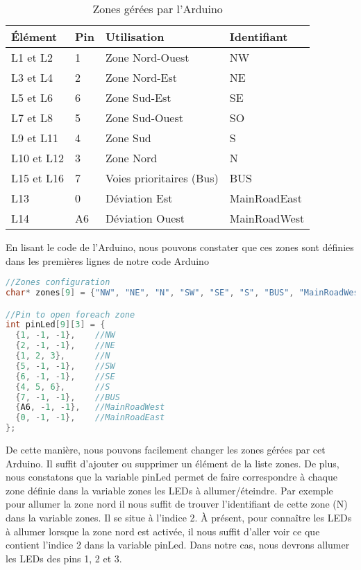\begin{table}[H]
\centering
\captionsetup{width=\textwidth}
{\renewcommand{\arraystretch}{1.5}
    \begin{tabular}{| l | l | l | l |}
    \hline
    \textbf{Élément} & \textbf{Pin} & \textbf{Utilisation} & \textbf{Identifiant}\\
    \hline
    L1 et L2 & 1 & Zone Nord-Ouest & NW\\
    \hline
    L3 et L4 & 2 & Zone Nord-Est & NE\\
    \hline
    L5 et L6 & 6 & Zone Sud-Est & SE\\
    \hline
    L7 et L8 & 5 & Zone Sud-Ouest & SO\\
    \hline
    L9 et L11 & 4 & Zone Sud & S\\
    \hline
    L10 et L12 & 3 & Zone Nord & N\\
    \hline
    L15 et L16 & 7 & Voies prioritaires (Bus) & BUS\\
    \hline
    L13 & 0 & Déviation Est & MainRoadEast\\
    \hline
    L14 & A6 & Déviation Ouest & MainRoadWest\\
    \hline
    \end{tabular}}
    \caption{Zones gérées par l'Arduino}
\end{table}

En lisant le code de l’Arduino, nous pouvons constater que ces zones sont définies dans les premières lignes de notre code Arduino

\begin{lstlisting}[language=C, numbers=none]
//Zones configuration
char* zones[9] = {"NW", "NE", "N", "SW", "SE", "S", "BUS", "MainRoadWest", "MainRoadEast"}; //Zone managed by this arduino

//Pin to open foreach zone
int pinLed[9][3] = {
  {1, -1, -1},    //NW
  {2, -1, -1},    //NE
  {1, 2, 3},      //N
  {5, -1, -1},    //SW
  {6, -1, -1},    //SE
  {4, 5, 6},      //S
  {7, -1, -1},    //BUS
  {A6, -1, -1},   //MainRoadWest
  {0, -1, -1},    //MainRoadEast
};
\end{lstlisting}

De cette manière, nous pouvons facilement changer les zones gérées par cet Arduino. Il suffit d’ajouter ou supprimer un élément de la liste zones. De plus, nous constatons que la variable pinLed permet de faire correspondre à chaque zone définie dans la variable zones les LEDs à allumer/éteindre. Par exemple pour allumer la zone nord il nous suffit de trouver l’identifiant de cette zone (N) dans la variable zones. Il se situe à l’indice 2. À présent, pour connaître les LEDs à allumer lorsque la zone nord est activée, il nous suffit d’aller voir ce que contient l’indice 2 dans la variable pinLed. Dans notre cas, nous devrons allumer les LEDs des pins 1, 2 et 3. \\

